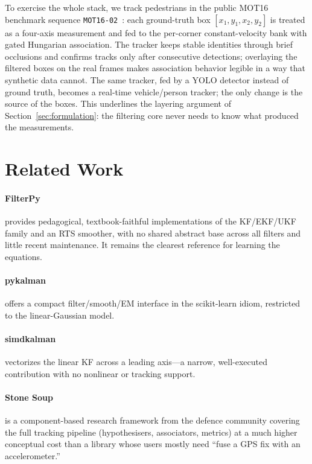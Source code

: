 \documentclass[10pt,conference]{IEEEtran}
\begin{document}
To exercise the whole stack, we track pedestrians in the public MOT16
benchmark sequence \texttt{MOT16-02}~\cite{mot16}: each ground-truth box
$[x_1,y_1,x_2,y_2]$ is treated as a four-axis measurement and fed to the
per-corner constant-velocity bank with gated Hungarian association. The
tracker keeps stable identities through brief occlusions and confirms tracks
only after consecutive detections; overlaying the filtered boxes on the real
frames makes association behavior legible in a way that synthetic data cannot.
The same tracker, fed by a YOLO detector instead of ground truth, becomes a
real-time vehicle/person tracker; the only change is the source of the boxes.
This underlines the layering argument of Section~\ref{sec:formulation}: the
filtering core never needs to know what produced the measurements.

\section{Related Work}

\paragraph{FilterPy} provides pedagogical, textbook-faithful implementations
of the KF/EKF/UKF family and an RTS smoother, with no shared abstract base
across all filters and little recent maintenance. It remains the clearest
reference for learning the equations.

\paragraph{pykalman} offers a compact filter/smooth/EM interface in the
scikit-learn idiom, restricted to the linear-Gaussian model.

\paragraph{simdkalman} vectorizes the linear KF across a leading axis---a
narrow, well-executed contribution with no nonlinear or tracking support.

\paragraph{Stone Soup} is a component-based research framework from the
defence community covering the full tracking pipeline (hypothesisers,
associators, metrics) at a much higher conceptual cost than a library whose
users mostly need ``fuse a GPS fix with an accelerometer.''
\end{document}
